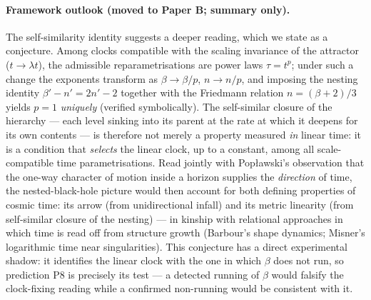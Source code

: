 \documentclass[11pt]{article}
\begin{document}
\paragraph{Framework outlook (moved to Paper B; summary only).} The self-similarity identity suggests a deeper reading, which we state as a conjecture. Among clocks compatible with the scaling invariance of the attractor ($t \to \lambda t$), the admissible reparametrisations are power laws $\tau = t^{p}$; under such a change the exponents transform as $\beta \to \beta/p$, $n \to n/p$, and imposing the nesting identity $\beta' - n' = 2n' - 2$ together with the Friedmann relation $n = (\beta+2)/3$ yields $p = 1$ \emph{uniquely} (verified symbolically). The self-similar closure of the hierarchy --- each level sinking into its parent at the rate at which it deepens for its own contents --- is therefore not merely a property measured \emph{in} linear time: it is a condition that \emph{selects} the linear clock, up to a constant, among all scale-compatible time parametrisations. Read jointly with Popławski's observation that the one-way character of motion inside a horizon supplies the \emph{direction} of time, the nested-black-hole picture would then account for both defining properties of cosmic time: its arrow (from unidirectional infall) and its metric linearity (from self-similar closure of the nesting) --- in kinship with relational approaches in which time is read off from structure growth (Barbour's shape dynamics; Misner's logarithmic time near singularities). This conjecture has a direct experimental shadow: it identifies the linear clock with the one in which $\beta$ does not run, so prediction P8 is precisely its test --- a detected running of $\beta$ would falsify the clock-fixing reading while a confirmed non-running would be consistent with it.
\end{document}

